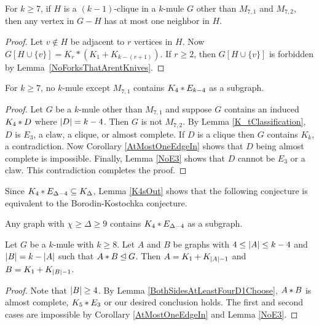 \begin{cor}\label{AtMostOneEdgeIn}
For $k \geq 7$, if $H$ is a $(k - 1)$-clique in a $k$-mule $G$ other than
$M_{7,1}$ and $M_{7,2}$, then any vertex in $G - H$ has at most one neighbor in
$H$.
\end{cor}
\begin{proof}
Let $v\notin H$ be adjacent to $r$ vertices in $H$.  Now
$G[H\cup\{v\}]=K_r*(K_1+K_{k-(r+1)})$.  If $r\ge 2$, then $G[H\cup\{v\}]$ is
forbidden by Lemma~\ref{NoForksThatArentKnives}.
\end{proof}

\begin{lem}\label{K4sOut}
For $k \geq 7$, no $k$-mule except $M_{7,1}$ contains
$K_4 \mbox{\hspace{2 pt}$\ast$\hspace{2 pt}} E_{k-4}$ as a subgraph.
\end{lem}
\begin{proof}
Let $G$ be a $k$-mule other than $M_{7,1}$ and suppose $G$
contains an induced $K_4 \mbox{\hspace{2 pt}$\ast$\hspace{2 pt}} D$ where $\left|D\right| = k - 4$. Then $G$ is not
$M_{7,2}$. By Lemma \ref{K_tClassification}, $D$ is $E_3$, a claw, a clique, or
almost complete. If $D$ is a clique then $G$  contains $K_k$, a contradiction. Now Corollary \ref{AtMostOneEdgeIn} shows that $D$ being almost complete is
impossible. Finally, Lemma \ref{NoE3} shows that $D$ cannot be $E_3$ or a claw.  This contradiction completes the proof.
\end{proof}

Since $K_4 \mbox{\hspace{2 pt}$\ast$\hspace{2 pt}} E_{\Delta - 4} \subseteq K_\Delta$, Lemma \ref{K4sOut} shows that the following conjecture is equivalent to the Borodin-Kostochka conjecture.

\begin{conjecture}\label{K4Conjecture}
Any graph with $\chi \geq \Delta \geq 9$ contains $K_4 \mbox{\hspace{2 pt}$\ast$\hspace{2 pt}} E_{\Delta - 4}$ as a subgraph.
\end{conjecture}

\begin{lem}\label{NonInducedFourDealInMule}
Let $G$ be a $k$-mule with $k \geq 8$. Let $A$ and $B$ be graphs with $4 \leq \left|A\right| \leq k - 4$ and $\left|B\right| = k - \left|A\right|$ such that $A \mbox{\hspace{2 pt}$\ast$\hspace{2 pt}} B \unlhd G$. 
Then $A = K_1 \mbox{\hspace{2 pt}$+$\hspace{2 pt}} K_{\left|A\right| - 1}$ and $B = K_1 \mbox{\hspace{2 pt}$+$\hspace{2 pt}} K_{\left|B\right| - 1}$.
\end{lem}
\begin{proof}
Note that $\left|B\right| \geq 4$. 
By Lemma \ref{BothSidesAtLeastFourD1Choose}, $A \mbox{\hspace{2 pt}$\ast$\hspace{2 pt}} B$ is almost complete, $K_5 \mbox{\hspace{2 pt}$\ast$\hspace{2 pt}} E_3$ or our desired conclusion holds.  
The first and second cases are impossible by Corollary \ref{AtMostOneEdgeIn} and
Lemma \ref{NoE3}.
\end{proof}

